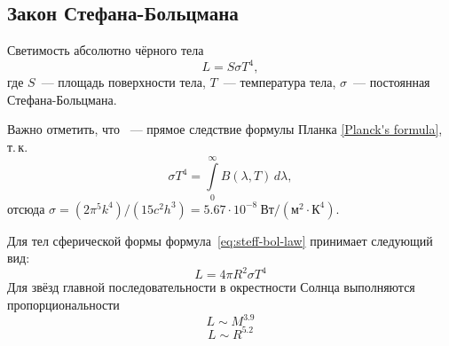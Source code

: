 \subsection{Закон Стефана-Больцмана}
Светимость абсолютно чёрного тела
	\begin{equation}
	L = S \sigma T^4,
	\label{eq:steff-bol-law}
\end{equation}
 где $S$~--- площадь поверхности тела, $T$~--- температура тела, $\sigma$~--- постоянная Стефана-Больцмана.
  
Важно отметить, что ~--- прямое следствие формулы Планка \eqref{Planck's formula}, т.\,к.\begin{equation}
	\sigma T^4 = \int\limits^\infty_0 B(\lambda, T)\,d\lambda,
\end{equation}
отсюда $\sigma = (2\pi^5k^4)/(15c^2h^3) = 5.67 \cdot 10^{-8}~\text{Вт}/(\text{м}^2\cdot \text{К}^4)$.


Для тел сферической формы формула~\eqref{eq:steff-bol-law} принимает следующий вид:
\begin{equation}
L=4\pi R^2\sigma T^4
\end{equation}
Для звёзд главной последовательности в окрестности Солнца выполняются пропорциональности
\begin{equation}
L\sim M^{3.9}
\end{equation}
\begin{equation}
L\sim R^{5.2}
\end{equation}